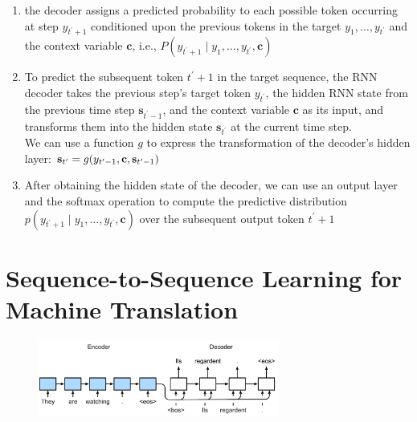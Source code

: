 \begin{enumerate}
    \item the decoder assigns a predicted probability to each possible token occurring at step $y_{t^\prime+1}$ conditioned upon the previous tokens in the target $y_1, \ldots, y_{t^\prime}$ and the context variable $\mathbf{c}$, i.e., $P(y_{t^\prime+1} \mid y_1, \ldots, y_{t^\prime}, \mathbf{c})$

    \item To predict the subsequent token $t^\prime+1$ in the target sequence, the RNN decoder takes the previous step’s target token $y_{t^\prime}$, the hidden RNN state from the previous time step $\mathbf{s}_{t^\prime-1}$, and the context variable $\mathbf{c}$ as its input, and transforms them into the hidden state $\mathbf{s}_{t^\prime}$ at the current time step.\\
    We can use a function $g$ to express the transformation of the decoder’s hidden layer:
    $
        \hfill
        \mathbf{s}_{t^\prime} = g(y_{t^\prime-1}, \mathbf{c}, \mathbf{s}_{t^\prime-1})
        \hfill
    $

    \item After obtaining the hidden state of the decoder, we can use an output layer and the softmax operation to compute the predictive distribution $p(y_{t^{\prime}+1} \mid y_1, \ldots, y_{t^\prime}, \mathbf{c})$ over the subsequent output token ${t^\prime+1}$

    
\end{enumerate}









\section{Sequence-to-Sequence Learning for Machine Translation \cite{dnn-1}}

\begin{figure}[H]
    \centering
    \includegraphics[width=\linewidth, height=2.5cm, keepaspectratio]{Pictures/Recurrent-Neural-Networks/seq2seq-nmt.jpg}
\end{figure}



